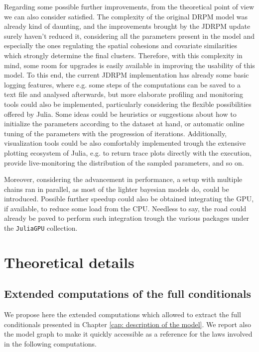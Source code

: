 \documentclass[12pt,	%
	a4paper,		%
	twoside,		%
	openright,		%
	titlepage,%
	]{book}
\theoremstyle{definition}
\newcommand{\mjline}[1]{\texttt{#1}}
\begin{document}
Regarding some possible further improvements, from the theoretical point of view we can also consider satisfied. The complexity of the original DRPM model was already kind of daunting, and the improvements brought by the JDRPM update surely haven't reduced it, considering all the parameters present in the model and especially the ones regulating the spatial cohesions and covariate similarities which strongly determine the final clusters. Therefore, with this complexity in mind, some room for upgrades is easily available in improving the usability of this model. To this end, the current JDRPM implementation has already some basic logging features, where e.g. some steps of the computations can be saved to a text file and analysed afterwards, but more elaborate profiling and monitoring tools could also be implemented, particularly considering the flexible possibilities offered by Julia. Some ideas could be heuristics or suggestions about how to initialize the parameters according to the dataset at hand, or automatic online tuning of the parameters with the progression of iterations. Additionally, visualization tools could be also comfortably implemented trough the extensive plotting ecosystem of Julia, e.g. to return trace plots directly with the execution, provide live-monitoring the distribution of the sampled parameters, and so on. 

Moreover, considering the advancement in performance, a setup with multiple chains ran in parallel, as most of the lighter bayesian models do, could be introduced. Possible further speedup could also be obtained integrating the GPU, if available, to reduce some load from the CPU. Needless to say, the road could already be paved to perform such integration trough the various packages under the \mjline{JuliaGPU} collection.


\appendix
% 
% 

\chapter{Theoretical details}
\label{app: theoretical details}

\section{Extended computations of the full conditionals} 
We propose here the extended computations which allowed to extract the full conditionals presented in Chapter \ref{cap: description of the model}. We report also the model graph to make it quickly accessible as a reference for the laws involved in the following computations.
\end{document}
